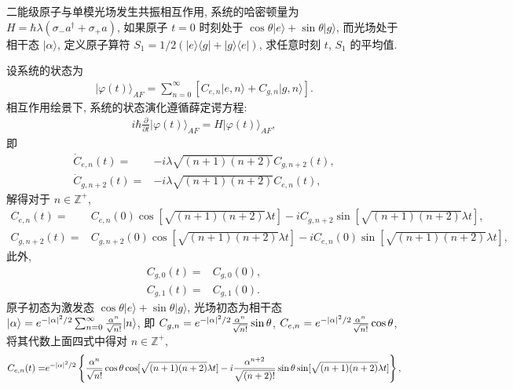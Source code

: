 \documentclass{assignment}
\begin{document}
\begin{prob}
    二能级原子与单模光场发生共振相互作用, 系统的哈密顿量为 $H=\hbar\lambda(\sigma_-a^{\dagger}+\sigma_+a)$, 如果原子 $t=0$ 时刻处于 $\cos\theta\lvert e\rangle+\sin\theta\lvert g\rangle$, 而光场处于相干态 $\lvert\alpha\rangle$, 定义原子算符 $S_1=1/2(\lvert e\rangle\langle g\rvert+\lvert g\rangle\langle e\rvert)$, 求任意时刻 $t$, $S_1$ 的平均值.
\end{prob}
\begin{sol}
    设系统的状态为
    \begin{align}
        \lvert\varphi(t)\rangle_{AF}=\sum_{n=0}^{\infty}[C_{e,n}\lvert e,n\rangle+C_{g,n}\lvert g,n\rangle].
    \end{align}
    相互作用绘景下, 系统的状态演化遵循薛定谔方程:
    \begin{align}
        i\hbar\frac{\partial}{\partial t}\lvert\varphi(t)\rangle_{AF}=H\lvert\varphi(t)\rangle_{AF},
    \end{align}
    即
    \begin{align}
        \dot{C}_{e,n}(t)=&-i\lambda\sqrt{(n+1)(n+2)}C_{g,n+2}(t),\\
        \dot{C}_{g,n+2}(t)=&-i\lambda\sqrt{(n+1)(n+2)}C_{e,n}(t),
    \end{align}
    解得对于 $n\in\mathbb{Z}^+$,
    \begin{align}
        C_{e,n}(t)=&C_{e,n}(0)\cos[\sqrt{(n+1)(n+2)}\lambda t]-iC_{g,n+2}\sin[\sqrt{(n+1)(n+2)}\lambda t],\\
        C_{g,n+2}(t)=&C_{g,n+2}(0)\cos[\sqrt{(n+1)(n+2)}\lambda t]-iC_{e,n}(0)\sin[\sqrt{(n+1)(n+2)}\lambda t],
    \end{align}
    此外,
    \begin{align}
        C_{g,0}(t)=&C_{g,0}(0),\\
        C_{g,1}(t)=&C_{g,1}(0).
    \end{align}
    原子初态为激发态 $\cos\theta\lvert e\rangle+\sin\theta\lvert g\rangle$, 光场初态为相干态 $\lvert\alpha\rangle=e^{-\left\lvert\alpha\right\rvert^2/2}\sum_{n=0}^{\infty}\frac{\alpha^n}{\sqrt{n!}}\lvert n\rangle$, 即 $C_{g,n}=e^{-\left\lvert\alpha\right\rvert^2/2}\frac{\alpha^n}{\sqrt{n!}}\sin\theta$, $C_{e,n}=e^{-\left\lvert\alpha\right\rvert^2/2}\frac{\alpha^n}{\sqrt{n!}}\cos\theta$, 将其代数上面四式中得对 $n\in\mathbb{Z}^+$,
    \begin{align}
        C_{e,n}(t)=&e^{-\abs{\alpha}^2/2}\left\{\frac{\alpha^n}{\sqrt{n!}}\cos\theta\cos[\sqrt{(n+1)(n+2)}\lambda t]-i\frac{\alpha^{n+2}}{\sqrt{(n+2)!}}\sin\theta\sin[\sqrt{(n+1)(n+2)}\lambda t]\right\},\\

\end{align}
\end{sol}
\end{document}
